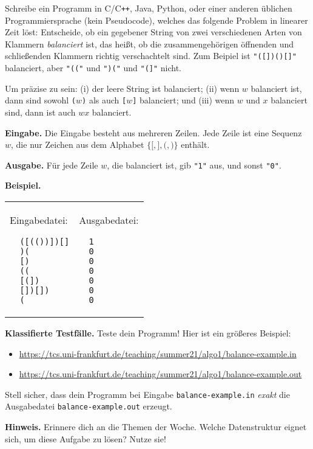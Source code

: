 \documentclass{uebung_cs}
\begin{document}
\begin{aufgabe}
  Schreibe ein Programm in C/C\verb|++|, Java, Python, oder einer anderen üblichen Programmiersprache (kein Pseudocode), welches das folgende Problem in linearer Zeit löst:
  Entscheide, ob ein gegebener String von zwei verschiedenen Arten von Klammern \emph{balanciert} ist, das heißt, ob die zusammengehörigen öffnenden und schließenden Klammern richtig verschachtelt sind. Zum Beipiel ist \texttt{"([])()[]"} balanciert, aber \texttt{"(("} und \texttt{")("} und \texttt{"(]"} nicht.
  
  Um präzise zu sein: (i) der leere String ist balanciert; (ii) wenn $w$ balanciert ist, dann sind sowohl \texttt{(}$w$\texttt{)} als auch \texttt{[}$w$\texttt{]} balanciert; und (iii) wenn $w$ und $x$ balanciert sind, dann ist auch $wx$ balanciert.
  
  \textbf{Eingabe.}
  Die Eingabe besteht aus mehreren Zeilen. Jede Zeile ist eine Sequenz $w$, die nur Zeichen aus dem Alphabet $\{\texttt{[},\texttt{]},\texttt{(},\texttt{)}\}$ enthält.
  
  \textbf{Ausgabe.}
  Für jede Zeile $w$, die balanciert ist, gib \texttt{"1"} aus, und sonst \texttt{"0"}.
  
  \textbf{Beispiel.}\\
  \begin{tabular}{p{}p{}}
  Eingabedatei:
  \begin{verbatim}
  ([(())])[]
  )(
  [)
  ((
  [(])
  [])[])
  (
  \end{verbatim}
  &
  Ausgabedatei:
  \begin{verbatim}
  1
  0
  0
  0
  0
  0
  0
  \end{verbatim}
  \end{tabular}
  
  \textbf{Klassifierte Testfälle.}
  Teste dein Programm! Hier ist ein größeres Beispiel:
  \begin{itemize}[noitemsep]
  \item \url{https://tcs.uni-frankfurt.de/teaching/summer21/algo1/balance-example.in}
  \item \url{https://tcs.uni-frankfurt.de/teaching/summer21/algo1/balance-example.out}
  \end{itemize}
  Stell sicher, dass dein Programm bei Eingabe \texttt{balance-example.in} \emph{exakt} die Ausgabedatei \texttt{balance-example.out} erzeugt.
  
  \textbf{Hinweis.}
  Erinnere dich an die Themen der Woche. Welche Datenstruktur eignet sich, um diese Aufgabe zu lösen? Nutze sie!
  

\end{aufgabe}
\end{document}

